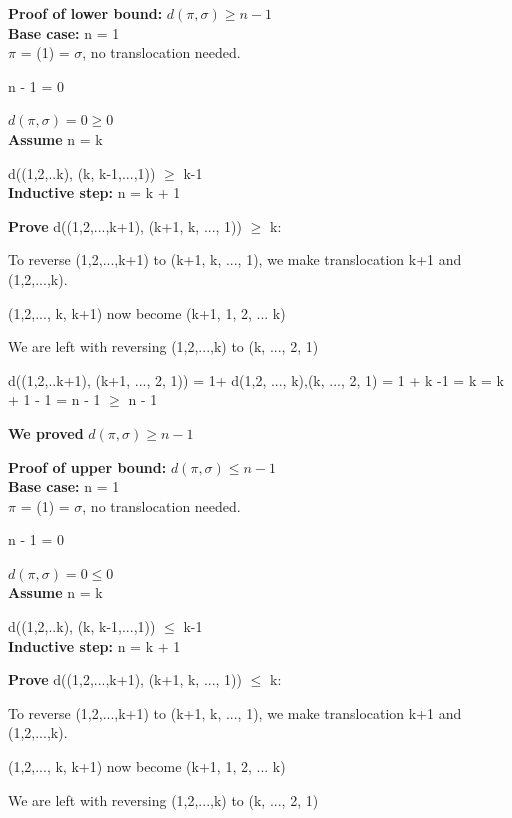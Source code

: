 \documentclass[runningheads]{llncs}
\begin{document}
\textbf{Proof of lower bound: }{\bf $d(\pi,\sigma) \geq n-1$} \\

\textbf{Base case:} n = 1 \\

$\pi$ = (1) = $\sigma$, no translocation needed.

n - 1 = 0

$d(\pi,\sigma) = 0 \geq 0$\\

\textbf{Assume} n = k 

d((1,2,..k), (k, k-1,...,1)) $\geq$ k-1\\

\textbf{Inductive step:} n = k + 1 

\textbf{Prove} d((1,2,...,k+1), (k+1, k, ..., 1)) $\geq$ k:

To reverse (1,2,...,k+1) to (k+1, k, ..., 1), we make translocation k+1 and (1,2,...,k). 

(1,2,..., k, k+1) now become (k+1, 1, 2, ... k) 

We are left with reversing (1,2,...,k) to (k, ..., 2, 1)

d((1,2,..k+1), (k+1, ..., 2, 1)) = 1+ d(1,2, ..., k),(k, ..., 2, 1) = 1 + k -1 = k = k + 1 - 1 = n - 1 $\geq$ n - 1

\textbf{We proved} {\bf $d(\pi,\sigma) \geq n-1$} 

\vspace{0.5cm}
\textbf{Proof of upper bound: }{\bf $d(\pi,\sigma) \leq n-1$} \\

\textbf{Base case:} n = 1 \\

$\pi$ = (1) = $\sigma$, no translocation needed.

n - 1 = 0

$d(\pi,\sigma) = 0 \leq 0$\\

\textbf{Assume} n = k 

d((1,2,..k), (k, k-1,...,1)) $\leq$ k-1\\

\textbf{Inductive step:} n = k + 1 

\textbf{Prove} d((1,2,...,k+1), (k+1, k, ..., 1)) $\leq$ k:

To reverse (1,2,...,k+1) to (k+1, k, ..., 1), we make translocation k+1 and (1,2,...,k). 

(1,2,..., k, k+1) now become (k+1, 1, 2, ... k) 

We are left with reversing (1,2,...,k) to (k, ..., 2, 1)
\end{document}
